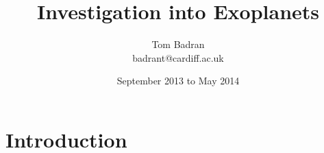 \documentclass[a4paper]{article}
\title{Investigation into Exoplanets}
\author{Tom Badran \\ badrant@cardiff.ac.uk}
\date{September 2013 to May 2014}
\numberwithin{equation}{section}
\begin{document}
\maketitle

\abstract


\section{Introduction}


\printbibliography
\end{document}
